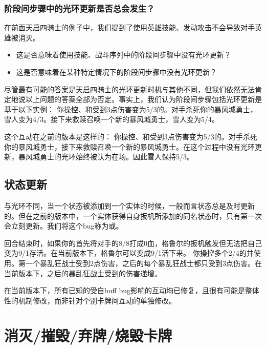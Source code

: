 \subsubsection{阶段间步骤中的光环更新是否总会发生？}
在前面天启四骑士的例子中，我们提到了使用英雄技能、发动攻击不会导致对手英雄被消灭。
\begin{itemize}
    \item 这是否意味着使用技能、战斗序列中的阶段间步骤中没有光环更新？
    \item 这是否意味着在某种特定情况下的阶段间步骤中没有光环更新？
\end{itemize}

尽管最有可能的答案是天启四骑士的光环更新时机与其他不同，但我们依然无法肯定地说以上问题的答案全部为否定。事实上，我们认为阶段间步骤包括光环更新是基于以下实例：
\example {}你操控、和受到3点伤害变为5/3的。对手杀死你的暴风城勇士，雪人变为4/3。接下来救赎召唤一个新的暴风城勇士，雪人变为5/4。

这个互动在之前的版本是这样的：
\example {}你操控、和受到3点伤害变为5/3的。对手杀死你的暴风城勇士，接下来救赎召唤一个新的暴风城勇士。在这个过程中没有光环更新，暴风城勇士的光环始终被认为在场。因此雪人保持5/3。

\subsection{状态更新}
与光环不同，当一个状态被添加到一个实体的时候，一般而言状态总是及时更新的。但在之前的版本中，一个实体获得自身扳机所添加的同名状态时，只有第一次会立刻更新。我们将这个bug称为或。

\example {}回合结束时，如果你的首先将对手的8/8打成0血，格鲁尔的扳机触发但无法把自己变为9/1存活。在当前版本下，格鲁尔可以变成9/1活下来。
\example {}你操控多个2/4的并使用。第一个暴乱狂战士受到2点伤害，之后的每个暴乱狂战士都只受到3点伤害。在当前版本下，之后的暴乱狂战士受到的伤害递增。

在当前版本下，所有已知的受自buff bug影响的互动均已修复，且很有可能是整体性的机制修改，而非针对个别卡牌间互动的单独修改。

\section{消灭/摧毁/弃牌/烧毁卡牌}

